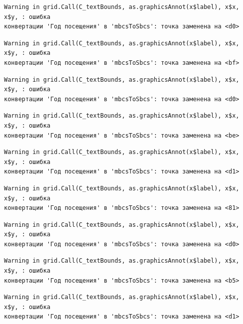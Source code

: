 \documentclass[
  letterpaper,
  DIV=11,
  numbers=noendperiod]{scrreprt}
\begin{document}
\begin{verbatim}
Warning in grid.Call(C_textBounds, as.graphicsAnnot(x$label), x$x, x$y, : ошибка
конвертации 'Год посещения' в 'mbcsToSbcs': точка заменена на <d0>
\end{verbatim}

\begin{verbatim}
Warning in grid.Call(C_textBounds, as.graphicsAnnot(x$label), x$x, x$y, : ошибка
конвертации 'Год посещения' в 'mbcsToSbcs': точка заменена на <bf>
\end{verbatim}

\begin{verbatim}
Warning in grid.Call(C_textBounds, as.graphicsAnnot(x$label), x$x, x$y, : ошибка
конвертации 'Год посещения' в 'mbcsToSbcs': точка заменена на <d0>
\end{verbatim}

\begin{verbatim}
Warning in grid.Call(C_textBounds, as.graphicsAnnot(x$label), x$x, x$y, : ошибка
конвертации 'Год посещения' в 'mbcsToSbcs': точка заменена на <be>
\end{verbatim}

\begin{verbatim}
Warning in grid.Call(C_textBounds, as.graphicsAnnot(x$label), x$x, x$y, : ошибка
конвертации 'Год посещения' в 'mbcsToSbcs': точка заменена на <d1>
\end{verbatim}

\begin{verbatim}
Warning in grid.Call(C_textBounds, as.graphicsAnnot(x$label), x$x, x$y, : ошибка
конвертации 'Год посещения' в 'mbcsToSbcs': точка заменена на <81>
\end{verbatim}

\begin{verbatim}
Warning in grid.Call(C_textBounds, as.graphicsAnnot(x$label), x$x, x$y, : ошибка
конвертации 'Год посещения' в 'mbcsToSbcs': точка заменена на <d0>
\end{verbatim}

\begin{verbatim}
Warning in grid.Call(C_textBounds, as.graphicsAnnot(x$label), x$x, x$y, : ошибка
конвертации 'Год посещения' в 'mbcsToSbcs': точка заменена на <b5>
\end{verbatim}

\begin{verbatim}
Warning in grid.Call(C_textBounds, as.graphicsAnnot(x$label), x$x, x$y, : ошибка
конвертации 'Год посещения' в 'mbcsToSbcs': точка заменена на <d1>
\end{verbatim}
\end{document}
